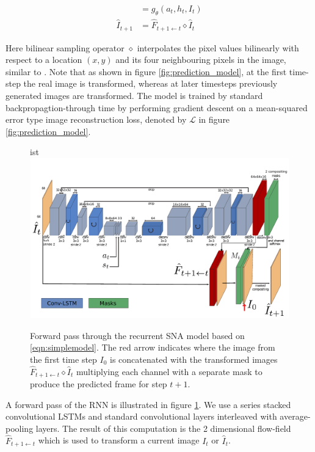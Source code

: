 \begin{align}
[h_{t+1}, \hat{F}_{t+1 \leftarrow t}] 	&= g_{\theta}(a_t, h_t, I_t) \\
\hat{I}_{t+1} 							&= \hat{F}_{t+1 \leftarrow t} \diamond  \hat{I}_t 
\label{simple_dna}
\end{align}

Here bilinear sampling operator $\diamond$ interpolates the pixel values bilinearly with respect to a location $(x,y)$ and its four neighbouring pixels in the image, similar to \cite{zhou2016view}. Note that as shown in figure \ref{fig:prediction_model}, at the first time-step the real image is transformed, whereas at later timesteps previously generated images are transformed. The model is trained by standard backpropagtion-through time by performing gradient descent on a mean-squared error type image reconstruction loss, denoted by $\mathcal{L}$ in figure \ref{fig:prediction_model}.

\begin{figure}[t]
    \centering
ist    \includegraphics[width=\columnwidth]{images_sna/occlusionaware/architecture.pdf}
    \caption{\small{Forward pass through the recurrent SNA model based on \autoref{eqn:simplemodel}. The red arrow indicates where the image from the first time step $I_0$ is concatenated with the transformed images $\hat{F}_{t+1 \leftarrow t} \diamond  \hat{I}_t $ multiplying each channel with a separate mask to produce the predicted frame for step $t+1$.}}      \label{fig:occlusion_model}
\end{figure}

\label{subsec:pixel_trafo}
A forward pass of the RNN is illustrated in figure \ref{fig:occlusion_model}. We use a series stacked convolutional LSTMs and standard convolutional layers interleaved with average-pooling layers. The result of this computation is the 2 dimensional flow-field $\hat{F}_{t+1 \leftarrow t}$ which is used to transform a current image $I_t$ or $\hat{I}_t$.

